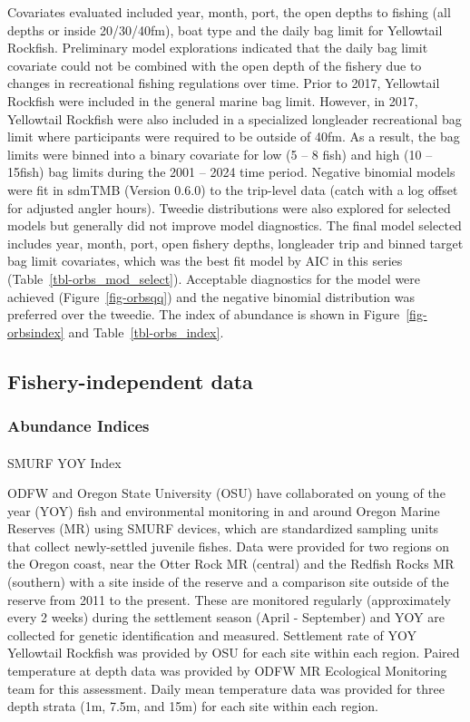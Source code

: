 \documentclass[
]{scrartcl}
\makeatletter
\let\oldparagraph\paragraph
\renewcommand{\paragraph}{
    \@ifstar
      \xxxParagraphStar
      \xxxParagraphNoStar
  }
\newcommand{\xxxParagraphStar}[1]{\oldparagraph*{#1}\mbox{}}
\newcommand{\xxxParagraphNoStar}[1]{\oldparagraph{#1}\mbox{}}
\makeatother
\begin{document}
Covariates evaluated included year, month, port, the open depths to
fishing (all depths or inside 20/30/40fm), boat type and the daily bag
limit for Yellowtail Rockfish. Preliminary model explorations indicated
that the daily bag limit covariate could not be combined with the open
depth of the fishery due to changes in recreational fishing regulations
over time. Prior to 2017, Yellowtail Rockfish were included in the
general marine bag limit. However, in 2017, Yellowtail Rockfish were
also included in a specialized longleader recreational bag limit where
participants were required to be outside of 40fm. As a result, the bag
limits were binned into a binary covariate for low (5 -- 8 fish) and
high (10 -- 15fish) bag limits during the 2001 -- 2024 time period.
Negative binomial models were fit in sdmTMB (Version 0.6.0) to the
trip-level data (catch with a log offset for adjusted angler hours).
Tweedie distributions were also explored for selected models but
generally did not improve model diagnostics. The final model selected
includes year, month, port, open fishery depths, longleader trip and
binned target bag limit covariates, which was the best fit model by AIC
in this series (Table~\ref{tbl-orbs_mod_select}). Acceptable diagnostics
for the model were achieved (Figure~\ref{fig-orbsqq}) and the negative
binomial distribution was preferred over the tweedie. The index of
abundance is shown in Figure~\ref{fig-orbsindex} and
Table~\ref{tbl-orbs_index}.

\subsection{Fishery-independent data}\label{fishery-independent-data}

\subsubsection{Abundance Indices}\label{abundance-indices-1}

\paragraph{SMURF YOY Index}\label{smurf-yoy-index}

ODFW and Oregon State University (OSU) have collaborated on young of the
year (YOY) fish and environmental monitoring in and around Oregon Marine
Reserves (MR) using SMURF devices, which are standardized sampling units
that collect newly-settled juvenile fishes. Data were provided for two
regions on the Oregon coast, near the Otter Rock MR (central) and the
Redfish Rocks MR (southern) with a site inside of the reserve and a
comparison site outside of the reserve from 2011 to the present. These
are monitored regularly (approximately every 2 weeks) during the
settlement season (April - September) and YOY are collected for genetic
identification and measured. Settlement rate of YOY Yellowtail Rockfish
was provided by OSU for each site within each region. Paired temperature
at depth data was provided by ODFW MR Ecological Monitoring team for
this assessment. Daily mean temperature data was provided for three
depth strata (1m, 7.5m, and 15m) for each site within each region.
\end{document}
